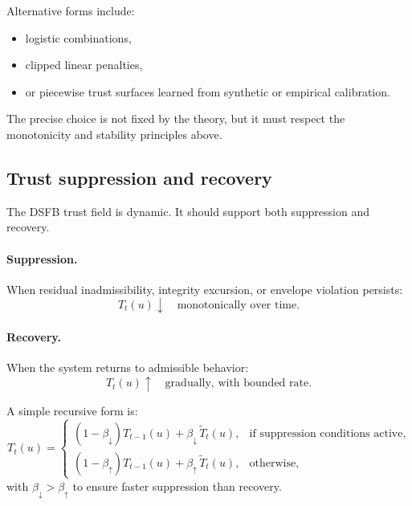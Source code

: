 \documentclass[11pt,letterpaper]{article}
\theoremstyle{gcresult}
\theoremstyle{definition}
\begin{document}
Alternative forms include:
\begin{itemize}[leftmargin=1.5em]
    \item logistic combinations,
    \item clipped linear penalties,
    \item or piecewise trust surfaces learned from synthetic or empirical calibration.
\end{itemize}

The precise choice is not fixed by the theory, but it must respect the monotonicity and stability principles above.


\subsection{Trust suppression and recovery}

The DSFB trust field is dynamic. It should support both suppression and recovery.

\paragraph{Suppression.}
When residual inadmissibility, integrity excursion, or envelope violation persists:
\begin{equation}
T_t(u)\downarrow \quad \text{monotonically over time}.
\end{equation}

\paragraph{Recovery.}
When the system returns to admissible behavior:
\begin{equation}
T_t(u)\uparrow \quad \text{gradually, with bounded rate}.
\end{equation}

A simple recursive form is:
\begin{equation}
T_t(u)=
\begin{cases}
(1-\beta_{\downarrow})T_{t-1}(u) + \beta_{\downarrow}\,\tilde T_t(u), & \text{if suppression conditions active},\\
(1-\beta_{\uparrow})T_{t-1}(u) + \beta_{\uparrow}\,\tilde T_t(u), & \text{otherwise},
\end{cases}
\end{equation}
with $\beta_{\downarrow}>\beta_{\uparrow}$ to ensure faster suppression than recovery.
\end{document}
